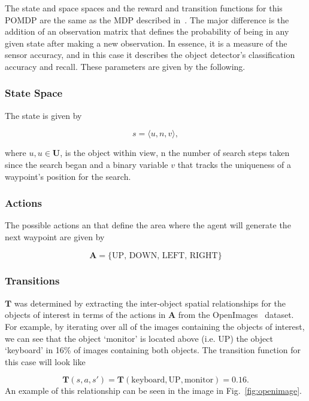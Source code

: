 \documentclass[runningheads]{llncs}
\begin{document}
The state and space spaces and the reward and transition functions for this POMDP are the same as the MDP described in~\cite{lock2019active}. 
The major difference is the addition of an observation matrix that defines the probability of being in any given state after making a new observation.
In essence, it is a measure of the sensor accuracy, and in this case it describes the object detector's classification accuracy and recall.
These parameters are given by the following. 

\subsubsection{State Space}

The state is given by

\begin{equation}
  s = \langle u, n, v \rangle,
\end{equation}

\noindent where $u, u\in\mathbf{U}$, is the object within view, n the number of search steps taken since the search began and a binary variable $v$ that tracks the uniqueness of a waypoint's position for the search.

\subsubsection{Actions}

The possible actions an that define the area where the agent will generate the next waypoint are given by

\begin{equation}
  \mathbf{A} = \{ \textrm{UP, DOWN, LEFT, RIGHT} \}
\end{equation}

\subsubsection{Transitions}

$\mathbf{T}$ was determined by extracting the inter-object spatial relationships for the objects of interest in terms of the actions in $\mathbf{A}$ from the OpenImages~\cite{openimages} dataset. 
For example, by iterating over all of the images containing the objects of interest, we can see that the object `monitor' is located above (i.e. UP) the object `keyboard' in 16\% of images containing both objects. 
The transition function for this case will look like 

\begin{equation}
  \mathbf{T}(s, a, s') = \mathbf{T}(\textrm{keyboard}, \textrm{UP}, \textrm{monitor}) = 0.16.
\end{equation}
An example of this relationship can be seen in the image in Fig.~\ref{fig:openimage}.
\end{document}
